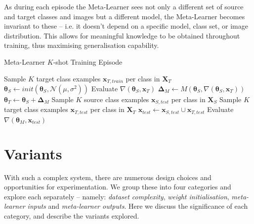 \documentclass{report}
\begin{document}
As during each episode the Meta-Learner sees not only a different set of source and target classes and images but a different model, the Meta-Learner becomes invariant to these -- i.e. it doesn't depend on a specific  model, class set, or image distribution. This allows for meaningful knowledge to be obtained throughout training, thus maximising generalisation capability. \par

\begin{algorithm}[h!]
	\caption{Meta-Learner $K$-shot Training Episode}
	\label{alg-episode}
	\begin{algorithmic}[1]
		\State Sample $K$ target class examples $\bm{x}_{T,train}$ per class in $\bm{X}_T$
		\State $\bm{\theta}_S \gets init(\bm{\theta}_S, \mathcal{N}(\mu, \sigma^2))$
		\State Evaluate $\nabla(\bm{\theta}_S,\bm{x}_T)$
		\State $\bm{\Delta}_M \gets M(\bm{\theta}_S, \nabla(\bm{\theta}_S,\bm{x}_T))$
		\State $\bm{\theta}_T \gets \bm{\theta}_S + \bm{\Delta}_M$
		\State Sample $K$ source class examples $\bm{x}_{S,test}$ per class in $\bm{X}_S$
		\State Sample $K$ target class examples $\bm{x}_{T,test}$ per class in $\bm{X}_T$
		\State $\bm{x}_{test} \gets \bm{x}_{S,test} \cup \bm{x}_{T,test}$
		\State Evaluate $\nabla(\bm{\theta}_M, \bm{x}_{test})$
	\end{algorithmic}
\end{algorithm}

\section{Variants} \label{approaches}
With such a complex system, there are numerous design choices and opportunities for experimentation. We group these into four categories and explore each separately -- namely: \textit{dataset complexity}, \textit{weight initialisation}, \textit{meta-learner inputs} and \textit{meta-learner outputs}. Here we discuss the significance of each category, and describe the variants explored. \par
\end{document}
